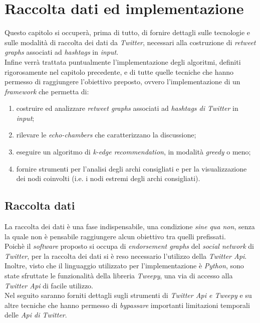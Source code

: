 \chapter{Raccolta dati ed implementazione}
\label{chap:implementazione}

Questo capitolo si occuperà, prima di tutto, di fornire dettagli sulle tecnologie e sulle modalità di raccolta dei dati da \textit{Twitter}, necessari alla costruzione di \textit{retweet graphs} associati ad \textit{hashtags} in \textit{input}.
\\Infine verrà trattata puntualmente l'implementazione degli algoritmi, definiti rigorosamente nel capitolo precedente, e di tutte quelle tecniche che hanno permesso di raggiungere l'obiettivo preposto, ovvero l'implementazione di un \textit{framework} che permetta di:
\begin{enumerate}
\item costruire ed analizzare \textit{retweet graphs} associati ad \textit{hashtags di Twitter} in \textit{input};
\item rilevare le \textit{echo-chambers} che caratterizzano la discussione;
\item eseguire un algoritmo di \textit{k-edge recommendation}, in modalità \textit{greedy} o meno;
\item fornire strumenti per l'analisi degli archi consigliati e per la visualizzazione dei nodi coinvolti (i.e. i nodi estremi degli archi consigliati).  
\end{enumerate}

\section{Raccolta dati}
La raccolta dei dati è una fase indispensabile, una condizione \textit{sine qua non}, senza la quale non è pensabile raggiungere alcun obiettivo tra quelli prefissati.
\\Poichè il \textit{software} proposto si occupa di \textit{endorsement graphs} del \textit{social network} di \textit{Twitter}, per la raccolta dei dati si è reso necessario l'utilizzo della \textit{Twitter Api}. Inoltre, visto che il linguaggio utilizzato per l'implementazione è \textit{Python}, sono state sfruttate le funzionalità della libreria \textit{Tweepy}, una via di accesso alla \textit{Twitter Api} di facile utilizzo. 
\\Nel seguito saranno forniti dettagli sugli strumenti di \textit{Twitter Api e Tweepy} e su altre tecniche che hanno permesso di \textit{bypassare} importanti limitazioni temporali delle \textit{Api di Twitter}.  

